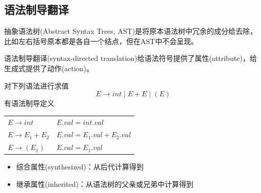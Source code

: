 \subsection{语法制导翻译}
抽象语法树(Abstract Syntax Trees, AST)是将原本语法树中冗余的成分给去除，比如左右括号原本都是各自一个结点，但在AST中不会呈现。

语法制导翻译(syntax-directed translation)给语法符号提供了属性(attribute)，给生成式提供了动作(action)。
\begin{example}
对下列语法进行求值
\[E\to int\mid E+E\mid (E)\]
有语法制导定义
\begin{center}
\begin{tabular}{ll}
$E\to int$ & $E.val=int.val$\\
$E\to E_1+E_2$ & $E.val=E_1.val+E_2.val$\\
$E\to (E_1)$ & $E.val=E_1.val$
\end{tabular}
\end{center}
\end{example}

\begin{itemize}
\item 综合属性(synthesized)：从后代计算得到
\item 继承属性(inherited)：从语法树的父亲或兄弟中计算得到
\end{itemize}